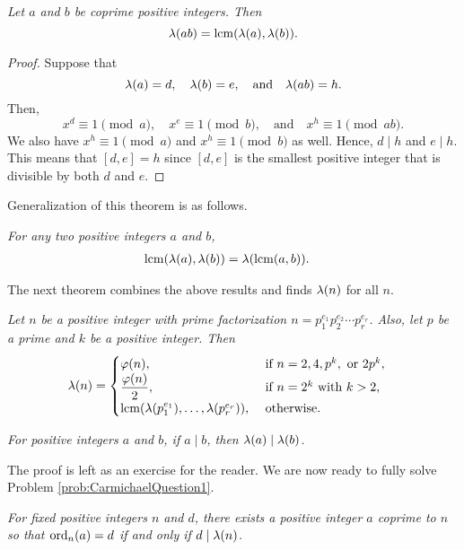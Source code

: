 \documentclass{subfile}
\begin{document}
	\begin{theorem}\slshape
		Let $a$ and $b$ be coprime positive integers. Then
		 \[\lambda(ab)=\operatorname{lcm}(\lambda(a),\lambda(b)).\]
	\end{theorem}
	
	\begin{proof}
		Suppose that $$\lambda(a)=d, \quad \lambda(b)=e, \quad \text{and} \quad \lambda(ab)=h.$$ Then, $$x^d\equiv1\pmod a, \quad x^e\equiv1\pmod b, \quad \text{and} \quad x^{h}\equiv1\pmod{ab}.$$ We also have $x^h\equiv1\pmod a$ and $x^h\equiv1\pmod b$ as well. Hence, $d \mid h$ and $e \mid h$. This means that $[d,e]=h$ since $[d,e]$ is the smallest positive integer that is divisible by both $d$ and $e$.
	\end{proof}
	Generalization of this theorem is as follows.
	\begin{theorem}\slshape
		For any two positive integers $a$ and $b$,
		\begin{align*}
		\operatorname{lcm}(\lambda(a),\lambda(b)) & = \lambda(\operatorname{lcm}(a,b)).
		\end{align*}
	\end{theorem}
	The next theorem combines the above results and finds $\lambda(n)$ for all $n$.
	\begin{theorem}\slshape\label{thm:CarmichaelFormula}
		Let $n$ be a positive integer with prime factorization $n=p_1^{e_1}p_2^{e_2}\cdots p_r^{e_r}$. Also, let $p$ be a prime and $k$ be a positive integer. Then
		\begin{align*}
		\lambda(n) & = 
		\begin{cases}
		\varphi(n),&\text{ if } n = 2,4,p^k, \text{ or } 2p^k,\\
		\dfrac{\varphi(n)}{2},& \text{ if }n=2^k\text{ with }k>2,\\
		\operatorname{lcm}(\lambda(p_1^{e_1}),\ldots,\lambda(p_r^{e_r})), & \text{ otherwise.}
		\end{cases}
		\end{align*}
	\end{theorem}
	
	\begin{theorem}\slshape
		For positive integers $a$ and $b$, if $a \mid b$, then $\lambda(a) \mid \lambda(b)$.
	\end{theorem}
	The proof is left as an exercise for the reader. We are now ready to fully solve Problem \ref{prob:CarmichaelQuestion1}.
	\begin{theorem}\slshape
		For fixed positive integers $n$ and $d$, there exists a positive integer $a$  coprime to $n$ so that $\operatorname{ord}_n(a)=d$ if and only if $d \mid \lambda(n)$.
	\end{theorem}
	
\end{document}

